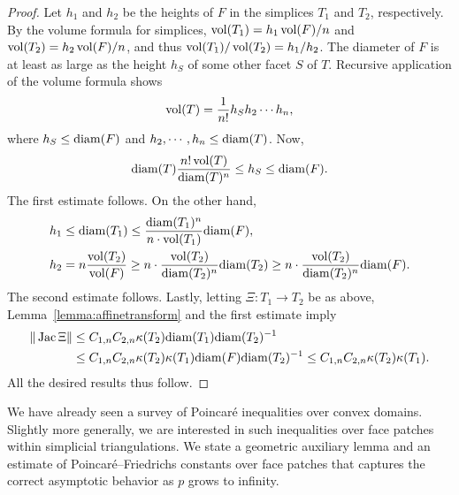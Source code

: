 \documentclass[12pt,a4paper]{article}
\begin{document}
\begin{proof}
    Let $h_1$ and $h_2$ be the heights of $F$ in the simplices $T_1$ and $T_2$, respectively. 
    By the volume formula for simplices, $\operatorname{vol}(T_1) = h_1 \operatorname{vol}(F)/n$ and $\operatorname{vol}(T_2) = h_2 \operatorname{vol}(F)/n$, and thus $\operatorname{vol}(T_1)/\operatorname{vol}(T_2) = h_1/h_2$.
    The diameter of $F$ is at least as large as the height $h_S$ of some other facet $S$ of $T$. Recursive application of the volume formula shows 
    \begin{align*}
        \operatorname{vol}(T) = \frac{1}{n!} h_S h_2 \cdots h_n,
    \end{align*}
    where $h_S \leq {\operatorname{diam}}(F)$ and $h_2, \cdots, h_n \leq {\operatorname{diam}}(T)$. Now, 
    \begin{align*}
        {\operatorname{diam}}(T) \frac{ n! \operatorname{vol}(T) }{ {\operatorname{diam}}(T)^{n} } \leq h_S \leq {\operatorname{diam}}(F).
    \end{align*}
    The first estimate follows. 
    On the other hand, 
    \begin{align*}
        h_1 &\leq {\operatorname{diam}}(T_1) \leq \frac{{\operatorname{diam}}(T_1)^{n}}{n \cdot \operatorname{vol}(T_1)} {\operatorname{diam}}(F),
        \\
        h_2 &= n \frac{\operatorname{vol}(T_2)}{\operatorname{vol}(F)} \geq n \cdot \frac{\operatorname{vol}(T_2)}{{\operatorname{diam}}(T_2)^{n}} {\operatorname{diam}}(T_2) \geq n \cdot \frac{\operatorname{vol}(T_2)}{{\operatorname{diam}}(T_2)^{n}} {\operatorname{diam}}(F)
        .
    \end{align*}
    The second estimate follows. 
    Lastly, letting $\Xi : T_1 \rightarrow T_2$ be as above, Lemma~\eqref{lemma:affinetransform} and the first estimate imply 
    \begin{align*}
        \| \operatorname{{\rm Jac}} \Xi \|
        &
        \leq 
        C_{1,n}
        C_{2,n}
        \kappa(T_2)
        {\operatorname{diam}}(T_1)
        {\operatorname{diam}}(T_2)^{-1}
        \\&
        \leq 
        C_{1,n}
        C_{2,n}
        \kappa(T_2)
        \kappa(T_1) 
        {\operatorname{diam}}(F)
        {\operatorname{diam}}(T_2)^{-1}
        \leq 
        C_{1,n}
        C_{2,n}
        \kappa(T_2)
        \kappa(T_1) 
        .
    \end{align*}
    All the desired results thus follow.
\end{proof}




We have already seen a survey of Poincar\'e inequalities over convex domains. 
Slightly more generally, we are interested in such inequalities over face patches within simplicial triangulations. 
We state a geometric auxiliary lemma and an estimate of Poincar\'e--Friedrichs constants over face patches 
that captures the correct asymptotic behavior as $p$ grows to infinity.
\end{document}
